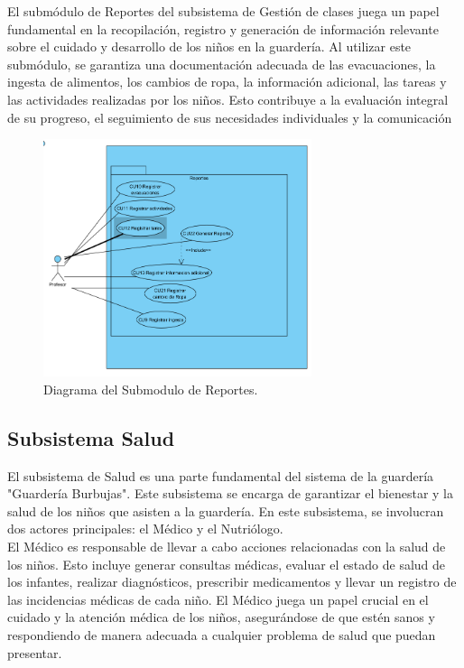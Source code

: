 El submódulo de Reportes del subsistema de Gestión de clases juega un papel fundamental en la recopilación, registro y generación de información relevante sobre el cuidado y desarrollo de los niños en la guardería. Al utilizar este submódulo, se garantiza una documentación adecuada de las evacuaciones, la ingesta de alimentos, los cambios de ropa, la información adicional, las tareas y las actividades realizadas por los niños. Esto contribuye a la evaluación integral de su progreso, el seguimiento de sus necesidades individuales y la comunicación


\begin{figure}[htbp]
\centering
\includegraphics[width=0.7\textwidth]{images/arqui/subSisGestClasesRepor.png}
\caption{Diagrama del Submodulo de Reportes.}
\label{fig:subsistGestionClasesRepor}
\end{figure}


\clearpage
\subsection{Subsistema Salud}

El subsistema de Salud es una parte fundamental del sistema de la guardería "Guardería Burbujas". Este subsistema se encarga de garantizar el bienestar y la salud de los niños que asisten a la guardería. En este subsistema, se involucran dos actores principales: el Médico y el Nutriólogo.\\

El Médico es responsable de llevar a cabo acciones relacionadas con la salud de los niños. Esto incluye generar consultas médicas, evaluar el estado de salud de los infantes, realizar diagnósticos, prescribir medicamentos y llevar un registro de las incidencias médicas de cada niño. El Médico juega un papel crucial en el cuidado y la atención médica de los niños, asegurándose de que estén sanos y respondiendo de manera adecuada a cualquier problema de salud que puedan presentar.

